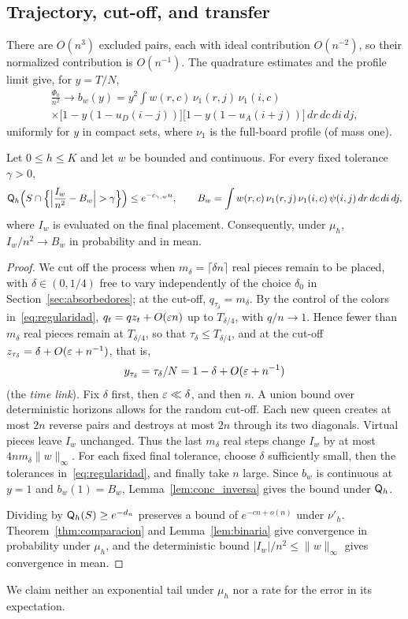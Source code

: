 \subsection{Trajectory, cut-off, and transfer}

There are $O(n^3)$ excluded pairs, each with ideal contribution $O(n^{-2})$, so their normalized
contribution is $O(n^{-1})$. The
quadrature estimates and the profile limit give, for $y=T/N$, \begin{multline*}
 \frac{\Phi_0}{n^2}\longrightarrow b_w(y)=y^2\int w(r,c)\,\nu_1(r,j)\,\nu_1(i,c)\\
 \times\bigl[1-y(1-u_{D}(i-j))\bigr]\bigl[1-y(1-u_{A}(i+j))\bigr]\,dr\,dc\,di\,dj ,
\end{multline*} uniformly for $y$ in compact sets, where $\nu_1$ is the full-board profile (of mass one).

\begin{proposicion}\label{prop:inversa} Let $0\le h\le K$ and let $w$ be
bounded and continuous.
For every fixed tolerance $\gamma>0$, \[
 \QQ_h\Bigl(S\cap\Bigl\{\Bigl|\frac{I_w}{n^2}-B_w\Bigr|>\gamma\Bigr\}\Bigr)\le e^{-c_{\gamma,w}n},
 \qquad B_w=\int w(r,c)\,\nu_1(r,j)\,\nu_1(i,c)\,\psi(i,j)\,dr\,dc\,di\,dj,
\] where $I_w$ is evaluated on the final placement. Consequently, under $\mu_h$, $I_w/n^2\to B_w$ in
probability and in mean. \end{proposicion}

\begin{proof} We cut off the process when $m_\delta=\lceil\delta n\rceil$ real pieces remain to be placed,
with $\delta\in(0,1/4)$ free
to vary independently of the choice $\delta_0$ in Section~\ref{sec:absorbedores}; at the cut-off,
$q_{\tau_\delta}=m_\delta$. By the
control of the colors in~\eqref{eq:regularidad}, $q_t=qz_t+O(\varepsilon n)$ up to $T_{\delta/4}$, with $q/n\to1$.
Hence fewer than
$m_\delta$ real pieces remain at $T_{\delta/4}$, so that $\tau_\delta\le T_{\delta/4}$, and at the cut-off
$z_{\tau_\delta}=\delta+O(\varepsilon+n^{-1})$, that is, \[
 y_{\tau_\delta}=\tau_\delta/N=1-\delta+O(\varepsilon+n^{-1})
\] (the \emph{time link}). Fix $\delta$ first, then $\varepsilon\ll\delta$, and then $n$. A union bound over
deterministic horizons allows for the random cut-off. Each new queen creates at most
$2n$ reverse pairs and destroys at most $2n$ through its two diagonals. Virtual pieces leave $I_w$
unchanged. Thus the last $m_\delta$
real steps change $I_w$ by at most $4nm_\delta\|w\|_\infty$. For each fixed final tolerance, choose $\delta$
sufficiently small, then
the tolerances in~\eqref{eq:regularidad}, and finally take $n$ large. Since $b_w$ is continuous at $y=1$ and
$b_w(1)=B_w$,
Lemma~\ref{lem:conc_inversa} gives the bound under $\mathsf{Q}_h$.

Dividing by $\mathsf{Q}_h(S)\ge e^{-d_n}$ preserves a bound of $e^{-cn+o(n)}$ under $\nu'_h$.
Theorem~\ref{thm:comparacion} and
Lemma~\ref{lem:binaria} give convergence in probability under $\mu_h$, and the deterministic bound
$|I_w|/n^2\le\|w\|_\infty$ gives
convergence in mean. \end{proof}

We claim neither an exponential tail under $\mu_h$ nor a rate for the error in its expectation.
